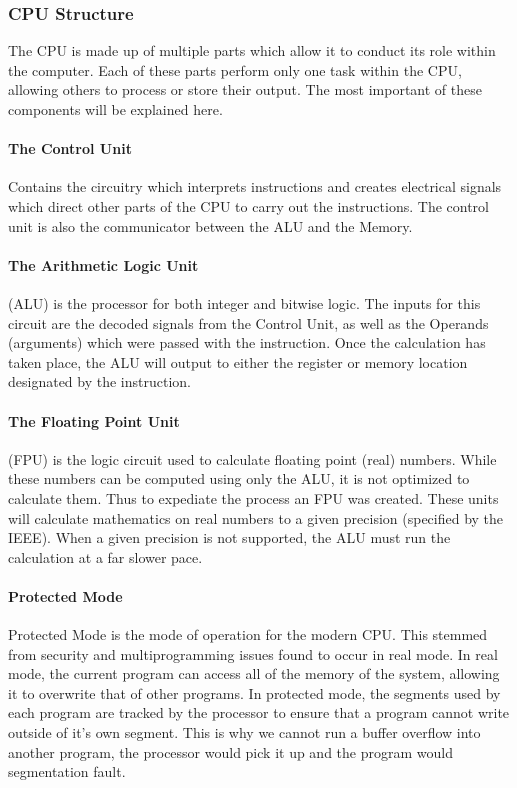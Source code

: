 \documentclass[a4paper,11pt]{report}
\begin{document}
			\subsubsection{CPU Structure}
				The CPU is made up of multiple parts which allow it to conduct its role within the computer. 
				Each of these parts perform only one task within the CPU, allowing others to process or store their output. 
				The most important of these components will be explained here. 
				\paragraph{The Control Unit}
					Contains the circuitry which interprets instructions and creates electrical signals which direct other parts of the CPU to carry out the instructions. 
					The control unit is also the communicator between the ALU and the Memory.
				\paragraph{The Arithmetic Logic Unit}
					(ALU) is the processor for both integer and bitwise logic. 
					The inputs for this circuit are the decoded signals from the Control Unit, as well as the Operands (arguments) which were passed with the instruction. 
					Once the calculation has taken place, the ALU will output to either the register or memory location designated by the instruction. 
				\paragraph{The Floating Point Unit}
					(FPU) is the logic circuit used to calculate floating point (real) numbers. 
					While these numbers can be computed using only the ALU, it is not optimized to calculate them.
					Thus to expediate the process an FPU was created. 
					These units will calculate mathematics on real numbers to a given precision (specified by the IEEE). %
					When a given precision is not supported, the ALU must run the calculation at a far slower pace. 
				\paragraph{Protected Mode} 
					Protected Mode is the mode of operation for the modern CPU. 
					This stemmed from security and multiprogramming issues found to occur in real mode. 
					In real mode, the current program can access all of the memory of the system, allowing it to overwrite that of other programs. 
					In protected mode, the segments used by each program are tracked by the processor to ensure that a program cannot write outside of it's own segment. 
					This is why we cannot run a buffer overflow into another program, the processor would pick it up and the program would segmentation fault. 
\end{document}

